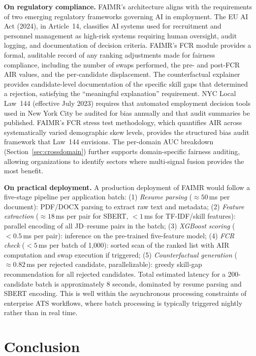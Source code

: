 \documentclass[smallcondensed,numbers]{sn-jnl}
\begin{document}
\textbf{On regulatory compliance.} FAIMR's architecture aligns with the requirements of two emerging regulatory frameworks governing AI in employment. The EU AI Act (2024), in Article~14, classifies AI systems used for recruitment and personnel management as high-risk systems requiring human oversight, audit logging, and documentation of decision criteria. FAIMR's FCR module provides a formal, auditable record of any ranking adjustments made for fairness compliance, including the number of swaps performed, the pre- and post-FCR AIR values, and the per-candidate displacement. The counterfactual explainer provides candidate-level documentation of the specific skill gaps that determined a rejection, satisfying the ``meaningful explanation'' requirement. NYC Local Law~144 (effective July 2023) requires that automated employment decision tools used in New York City be audited for bias annually and that audit summaries be published. FAIMR's FCR stress test methodology, which quantifies AIR across systematically varied demographic skew levels, provides the structured bias audit framework that Law~144 envisions. The per-domain AUC breakdown (Section~\ref{sec:crossdomain}) further supports domain-specific fairness auditing, allowing organizations to identify sectors where multi-signal fusion provides the most benefit.

\textbf{On practical deployment.} A production deployment of FAIMR would follow a five-stage pipeline per application batch: (1) \textit{Resume parsing} ($\approx 50$\,ms per document): PDF/DOCX parsing to extract raw text and metadata; (2) \textit{Feature extraction} ($\approx 18$\,ms per pair for SBERT, $< 1$\,ms for TF-IDF/skill features): parallel encoding of all JD--resume pairs in the batch; (3) \textit{XGBoost scoring} ($< 0.5$\,ms per pair): inference on the pre-trained five-feature model; (4) \textit{FCR check} ($< 5$\,ms per batch of 1,000): sorted scan of the ranked list with AIR computation and swap execution if triggered; (5) \textit{Counterfactual generation} ($\approx 0.82$\,ms per rejected candidate, parallelizable): greedy skill-gap recommendation for all rejected candidates. Total estimated latency for a 200-candidate batch is approximately 8 seconds, dominated by resume parsing and SBERT encoding. This is well within the asynchronous processing constraints of enterprise ATS workflows, where batch processing is typically triggered nightly rather than in real time.

\section{Conclusion}
\label{sec:conclusion}
\end{document}
